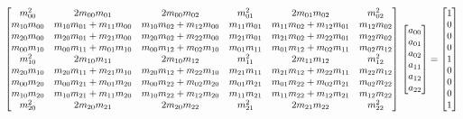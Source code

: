 \documentclass[conference]{IEEEtran}
\begin{document}
\begin{tiny}
  

\begin{equation}
\begin{bmatrix}
m_{00}^2 & 2m_{00}m_{01} & 2m_{00}m_{02} & m_{01}^2 & 2m_{01}m_{02} & m_{02}^2 \\
 m_{10}m_{00} & m_{10}m_{01}+ m_{11}m_{00}  & m_{10}m_{02} + m_{12}m_{00}& m_{11}m_{01} & m_{11}m_{02}  + m_{12}m_{01} & m_{12}m_{02}\\
 m_{20}m_{00} &  m_{20}m_{01}+ m_{21}m_{00 }&   m_{20}m_{02} + m_{22}m_{00} &  m_{21}m_{01} & m_{21}m_{02} + m_{22}m_{01} & m_{22}m_{02}\\
m_{00}m_{10} & m_{00}m_{11} + m_{01}m_{10} & m_{00}m_{12} + m_{02}m_{10} & m_{01}m_{11} & m_{01}m_{12} + m_{02}m_{11} & m_{02}m_{12}\\
 m_{10}^2 & 2m_{10}m_{11} & 2m_{10}m_{12} &  m_{11}^2 & 2m_{11}m_{12} & m_{12}^2\\
 m_{20}m_{10} & m_{20}m_{11}+ m_{21}m_{10} &  m_{20}m_{12}+ m_{22}m_{10} &  m_{21}m_{11}& m_{21}m_{12} + m_{22}m_{11} & m_{22}m_{12}\\
 m_{00}m_{20} & m_{00}m_{21} + m_{01}m_{20} & m_{00}m_{22} + m_{02}m_{20} & m_{01}m_{21} & m_{01}m_{22} + m_{02}m_{21} & m_{02}m_{22}\\
m_{10}m_{20} & m_{10}m_{21} + m_{11}m_{20} & m_{10}m_{22} + m_{12}m_{20} & m_{11}m_{21} & m_{11}m_{22} + m_{12}m_{21} & m_{12}m_{22}\\
 m_{20}^2 & 2m_{20}m_{21}& 2m_{20}m_{22} & m_{21}^2 & 2m_{21}m_{22} & m_{22}^2
 
\end{bmatrix} \\
\begin{bmatrix}
a_{00}\\
a_{01}\\
a_{02}\\
a_{11}\\
a_{12}\\
a_{22}
\end{bmatrix} = 
\begin{bmatrix}
1\\
0\\
0\\
0\\
1\\
0\\
0\\
0\\
1
\end{bmatrix}
\label{eq:least_sq_aat}
\end{equation}

\end{tiny}
\end{document}
